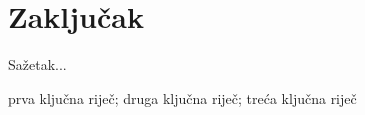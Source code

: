 \documentclass[diplomskirad]{fer}
\begin{document}
\chapter{Zaključak}
\label{pog:zakljucak}







\begin{sazetak}
  Sažetak...
\end{sazetak}

\begin{kljucnerijeci}
  prva ključna riječ; druga ključna riječ; treća ključna riječ
\end{kljucnerijeci}
\end{document}
